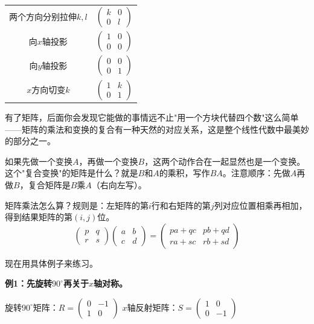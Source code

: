\documentclass[a4paper,12pt]{ctexart}
\begin{document}
\begin{center}
\begin{tabular}{c|c}
两个方向分别拉伸$k,l$ & $\begin{pmatrix}k&0\\0&l\end{pmatrix}$\\
向$x$轴投影 & $\begin{pmatrix}1&0\\0&0\end{pmatrix}$\\
向$y$轴投影 & $\begin{pmatrix}0&0\\0&1\end{pmatrix}$\\
$x$方向切变$k$ & $\begin{pmatrix}1&k\\0&1\end{pmatrix}$
\end{tabular}
\end{center}

有了矩阵，后面你会发现它能做的事情远不止"用一个方块代替四个数"这么简单——矩阵的乘法和变换的复合有一种天然的对应关系，这是整个线性代数中最美妙的部分之一。


如果先做一个变换$A$，再做一个变换$B$，这两个动作合在一起显然也是一个变换。这个"复合变换"的矩阵是什么？就是$B$和$A$的乘积，写作$BA$。注意顺序：先做$A$再做$B$，复合矩阵是$B$乘$A$（右向左写）。

矩阵乘法怎么算？规则是：左矩阵的第$i$行和右矩阵的第$j$列对应位置相乘再相加，得到结果矩阵的第$(i,j)$位。
\[
\begin{pmatrix}p&q\\r&s\end{pmatrix}
\begin{pmatrix}a&b\\c&d\end{pmatrix}
=
\begin{pmatrix}
pa+qc & pb+qd\\
ra+sc & rb+sd
\end{pmatrix}
\]

现在用具体例子来练习。

\textbf{例1：先旋转$90^\circ$再关于$x$轴对称。}

旋转$90^\circ$矩阵：$R=\begin{pmatrix}0&-1\\1&0\end{pmatrix}$
$x$轴反射矩阵：$S=\begin{pmatrix}1&0\\0&-1\end{pmatrix}$
\end{document}
